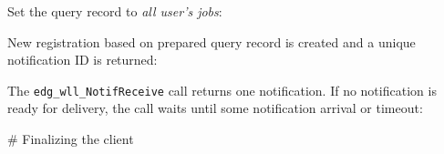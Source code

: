 Set the query record to \emph{all user's jobs}:


New registration based on prepared query record is created and a
unique notification ID is returned: 


The \verb'edg_wll_NotifReceive' call returns one notification. If no notification is 
ready for delivery, the call waits until some notification arrival or timeout:


# Finalizing the client

